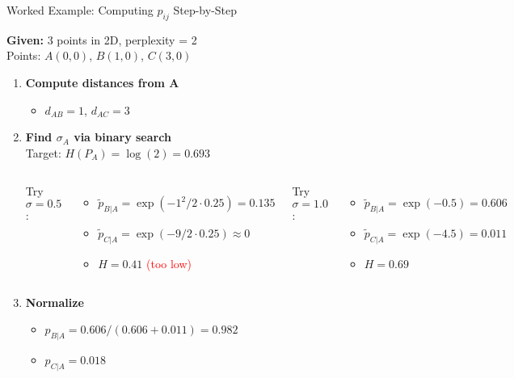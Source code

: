 \documentclass[aspectratio=169]{beamer}
\begin{document}
\begin{frame}{Worked Example: Computing $p_{ij}$ Step-by-Step}

\textbf{Given:} 3 points in 2D, perplexity = 2\\
Points: $A(0,0)$, $B(1,0)$, $C(3,0)$

\vspace{0.3cm}

\begin{enumerate}
    \item \textbf{Compute distances from A}
    \begin{itemize}
        \item $d_{AB} = 1$, $d_{AC} = 3$
    \end{itemize}
    
    \item \textbf{Find $\sigma_A$ via binary search}\\
    Target: $H(P_A) = \log(2) = 0.693$
    
    \begin{columns}
    Try $\sigma = 0.5$:
    \begin{itemize}
        \item $\tilde{p}_{B|A} = \exp(-1^2/2 \cdot 0.25) = 0.135$
        \item $\tilde{p}_{C|A} = \exp(-9/2 \cdot 0.25) \approx 0$
        \item $H = 0.41$ \textcolor{red}{(too low)}
    \end{itemize}
    
    Try $\sigma = 1.0$:
    \begin{itemize}
        \item $\tilde{p}_{B|A} = \exp(-0.5) = 0.606$
        \item $\tilde{p}_{C|A} = \exp(-4.5) = 0.011$
        \item $H = 0.69$ \textcolor{green}{\checkmark}
    \end{itemize}
    \end{columns}
    
    \item \textbf{Normalize}
    \begin{itemize}
        \item $p_{B|A} = 0.606/(0.606+0.011) = 0.982$
        \item $p_{C|A} = 0.018$
    \end{itemize}
\end{enumerate}

\end{frame}
\end{document}
